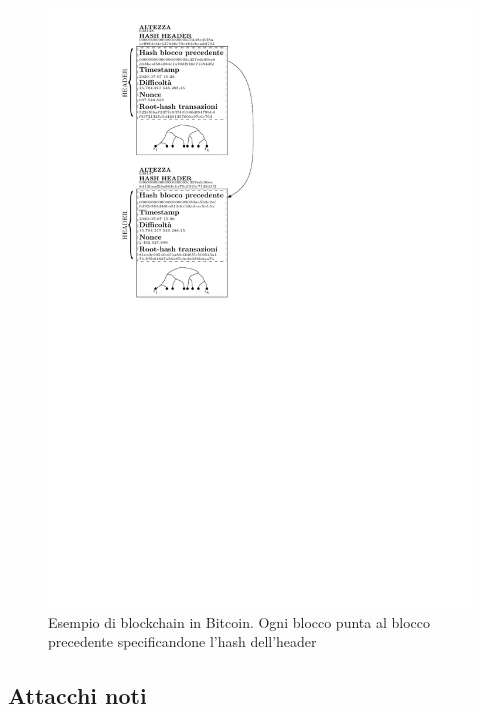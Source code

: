 \begin{figure}
	\centering
	\includegraphics[]{img/capuno/blockchain_bitcoin.pdf}
	\caption{Esempio di blockchain in Bitcoin. Ogni blocco punta al blocco precedente specificandone l'hash dell'header}
	\label{fig:bitcoin_blockchain}
\end{figure}


\subsection{Attacchi noti}\label{attacks}

